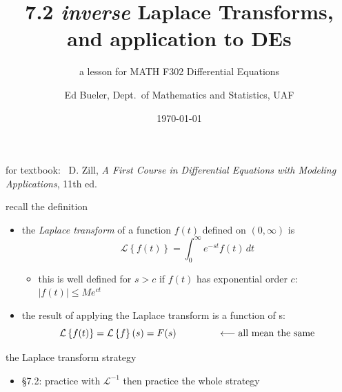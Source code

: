 \documentclass[urlcolor=blue,dvipsnames]{beamer}
\title{7.2 \emph{inverse} Laplace Transforms, \\ and application to DEs}
\subtitle{a lesson for MATH F302 Differential Equations}
\author{Ed Bueler, Dept.~of Mathematics and Statistics, UAF}
\date{\tiny \today}
\begin{document}
\renewcommand{\thefootnote}{{\color{green} \arabic{footnote}}}

\begin{frame}
\titlepage

\centerline{\tiny for textbook: \, D. Zill, \emph{A First Course in Differential Equations with Modeling Applications}, 11th ed.}
\end{frame}

\newcommand{\LL}[1]{\mathcal{L}\left\{#1\right\}}
\newcommand{\LLi}[1]{\mathcal{L}^{-1}\left\{#1\right\}}

\begin{frame}{recall the definition}

\begin{itemize}
\item the \emph{Laplace transform} of a function $f(t)$ defined on $(0,\infty)$ is
    $$\LL{f(t)} = \int_0^\infty e^{-st} f(t)\,dt$$
    \begin{itemize}
    \item this is well defined for $s>c$ if $f(t)$ has exponential order $c$:  $|f(t)| \le M e^{ct}$
    \end{itemize}

\bigskip
\item the result of applying the Laplace transform is a function of s:
    $$\LL{f(t)} = \LL{f}(s) = F(s) \hspace{15mm} \longleftarrow \text{all mean the same}$$
\end{itemize}
\end{frame}


\begin{frame}{the Laplace transform strategy}

\begin{center}
\end{center}

\vspace{10mm}
\begin{itemize}
\item \S 7.2: practice with $\mathcal{L}^{-1}$ then practice the whole strategy
\end{itemize}
\end{frame}
\end{document}
